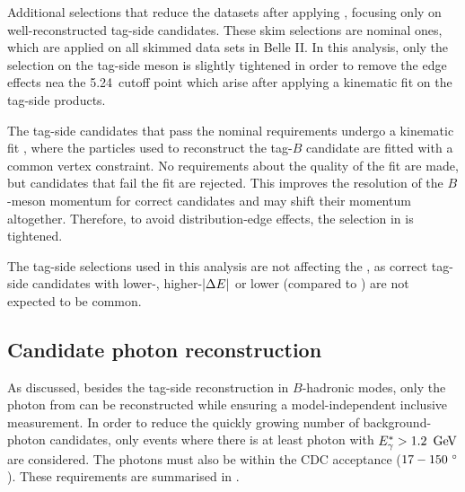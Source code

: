\begin{table}[htbp!]
    \centering
     \caption{\label{tab:fei_skim_cuts} 
     Additional selections that reduce the datasets after applying \FEI, focusing only on well-reconstructed tag-side candidates.
     These \FEI skim selections are nominal ones, which are applied on all \FEI skimmed data sets in Belle II.
     In this analysis, only the selection on the tag-side \B meson is slightly tightened in order to remove the edge effects nea the 5.24~\gev cutoff point which arise after applying a kinematic fit on the tag-side products.
     }
     \resizebox{0.75\textwidth}{!}{
        
     }
\end{table}

The tag-side candidates that pass the nominal \FEI requirements undergo a kinematic fit \cite{Belle-IIanalysissoftwareGroup:2019dlq}, 
where the particles used to reconstruct the tag-$B$ candidate are fitted with a common vertex constraint.
No requirements about the quality of the fit are made, but candidates that fail the fit are rejected.
This improves the resolution of the $B$-meson momentum for correct candidates and may shift their momentum altogether.
Therefore, to avoid distribution-edge effects, the \Mbc selection in  is tightened.

The tag-side selections used in this analysis are not affecting the \BtoXsgamma, 
as correct tag-side candidates with 
lower-\Mbc, 
higher-$|{\Delta E}|$ 
or lower \feiProb (compared to ) are not expected to be common.


\subsection{Candidate photon reconstruction}\label{sec:gamma_reconstruction}

As discussed, besides the tag-side reconstruction in $B$-hadronic modes, only the photon from \BtoXsgamma can be reconstructed while ensuring a model-independent inclusive measurement.
In order to reduce the quickly growing number of background-photon candidates, only events where there is at least photon with ${E^*_{\gamma}}>1.2~\mathrm{\,Ge\kern -0.1em V}$ are considered.
The photons must also be within the CDC acceptance ($17-150~^{\circ}$).
These requirements are summarised in .
\begin{table}[htbp!]
    \centering
     \caption{\label{tab:photon_requirements} Requirements for photons in reconstructed events.}
\end{table}


